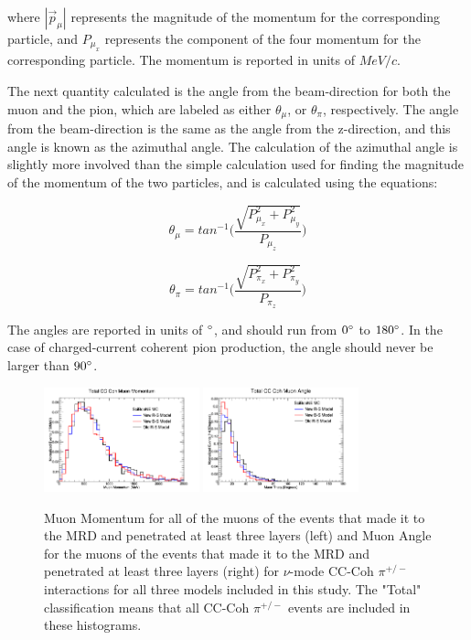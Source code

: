 \documentclass[11pt]{article}
\begin{document}
\noindent
where $|\vec{p}_\mu|$ represents the magnitude of the momentum for the corresponding particle, and $P_{\mu_x}$ represents the component of the four momentum for the corresponding particle. The momentum is reported in units of $MeV/c$.

The next quantity calculated is the angle from the beam-direction for both the muon and the pion, which are labeled as either $\theta_\mu$, or $\theta_\pi$, respectively. The angle from the beam-direction is the same as the angle from the z-direction, and this angle is known as the azimuthal angle. The calculation of the azimuthal angle is slightly more involved than the simple calculation used for finding the magnitude of the momentum of the two particles, and is calculated using the equations:

\begin{equation}
\theta_\mu = tan^{-1}\Bigg(\frac{\sqrt{P_{\mu_x}^2 + P_{\mu_y}^2}}{P_{\mu_z}}\Bigg)
\end{equation}

\begin{equation}
\theta_\pi = tan^{-1}\Bigg(\frac{\sqrt{P_{\pi_x}^2 + P_{\pi_y}^2}}{P_{\pi_z}}\Bigg)
\end{equation}

\noindent
The angles are reported in units of $\degree$, and should run from $0\degree$ to $180\degree$. In the case of charged-current coherent pion production, the angle should never be larger than $90\degree$.


\begin{figure}[H]
\centering
\includegraphics[width=0.4\textwidth]{CCCohPlots/NMCCCohTotalMomentum.png}
\includegraphics[width=0.4\textwidth]{CCCohPlots/NMCCCohTotalAngle.png}
\caption{Muon Momentum for all of the muons of the events that made it to the MRD and penetrated at least three layers (left) and Muon Angle for the muons of the events that made it to the MRD and penetrated at least three layers (right) for $\nu$-mode CC-Coh $\pi^{+/-}$ interactions for all three models included in this study. The "Total" classification means that all CC-Coh $\pi^{+/-}$ events are included in these histograms.}
\end{figure}\label{fig:NuModeCCCohTotalMomAndAng}
\end{document}
